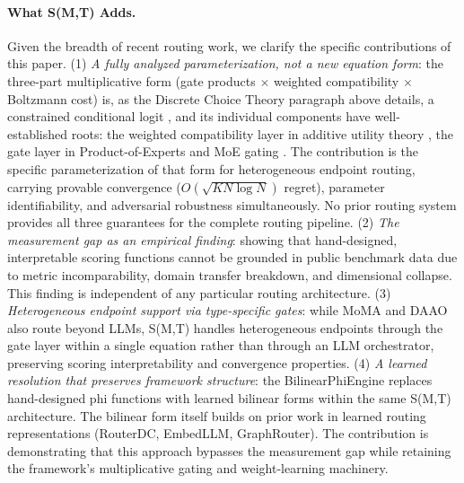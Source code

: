 \paragraph{What S(M,T) Adds.}
Given the breadth of recent routing work, we clarify the specific contributions of this paper. (1) \emph{A fully analyzed parameterization, not a new equation form}: the three-part multiplicative form (gate products $\times$ weighted compatibility $\times$ Boltzmann cost) is, as the Discrete Choice Theory paragraph above details, a constrained conditional logit \citep{mcfadden1974conditional, train2009discrete}, and its individual components have well-established roots: the weighted compatibility layer in additive utility theory \citep{fishburn1967additive, keeney1976decisions}, the gate layer in Product-of-Experts \citep{hinton2002poe} and MoE gating \citep{jacobs1991adaptive, shazeer2017outrageously}. The contribution is the specific parameterization of that form for heterogeneous endpoint routing, carrying provable convergence ($O(\sqrt{KN\log N})$ regret), parameter identifiability, and adversarial robustness simultaneously. No prior routing system provides all three guarantees for the complete routing pipeline. (2) \emph{The measurement gap as an empirical finding}: showing that hand-designed, interpretable scoring functions cannot be grounded in public benchmark data due to metric incomparability, domain transfer breakdown, and dimensional collapse. This finding is independent of any particular routing architecture. (3) \emph{Heterogeneous endpoint support via type-specific gates}: while MoMA and DAAO also route beyond LLMs, S(M,T) handles heterogeneous endpoints through the gate layer within a single equation rather than through an LLM orchestrator, preserving scoring interpretability and convergence properties. (4) \emph{A learned resolution that preserves framework structure}: the BilinearPhiEngine replaces hand-designed phi functions with learned bilinear forms within the same S(M,T) architecture. The bilinear form itself builds on prior work in learned routing representations (RouterDC, EmbedLLM, GraphRouter). The contribution is demonstrating that this approach bypasses the measurement gap while retaining the framework's multiplicative gating and weight-learning machinery.
